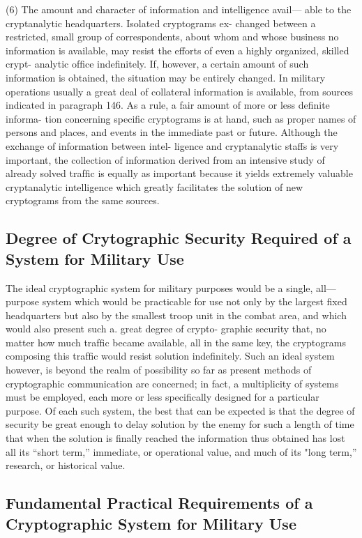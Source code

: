 (6) The amount and character of information and intelligence avail—
able to the cryptanalytic headquarters. Isolated cryptograms ex-
changed between a restricted, small group of correspondents,
about whom and whose business no information is available,
may resist the efforts of even a highly organized, skilled crypt-
analytic ofﬁce indeﬁnitely. If, however, a certain amount of
such information is obtained, the situation may be entirely
changed. In military operations usually a great deal of collateral
information is available, from sources indicated in paragraph
146. As a rule, a fair amount of more or less deﬁnite informa-
tion concerning speciﬁc cryptograms is at hand, such as proper
names of persons and places, and events in the immediate past
or future. Although the exchange of information between intel-
ligence and cryptanalytic staffs is very important, the collection
of information derived from an intensive study of already
solved trafﬁc is equally as important because it yields extremely
valuable cryptanalytic intelligence which greatly facilitates the
solution of new cryptograms from the same sources.

\subsection{Degree of Crytographic Security Required of a System for Military Use}

The ideal cryptographic system for military purposes would be a
single, all—purpose system which would be practicable for use not only by
the largest ﬁxed headquarters but also by the smallest troop unit in the
combat area, and which would also present such a. great degree of crypto-
graphic security that, no matter how much trafﬁc became available, all
in the same key, the cryptograms composing this trafﬁc would resist
solution indeﬁnitely. Such an ideal system however, is beyond the realm
of possibility so far as present methods of cryptographic communication
are concerned; in fact, a multiplicity of systems must be employed, each
more or less speciﬁcally designed for a particular purpose. Of each such
system, the best that can be expected is that the degree of security be
great enough to delay solution by the enemy for such a length of time
that when the solution is ﬁnally reached the information thus obtained
has lost all its “short term,” immediate, or operational value, and much
of its "long term,” research, or historical value.

\subsection{Fundamental Practical Requirements of a Cryptographic System for Military Use}

